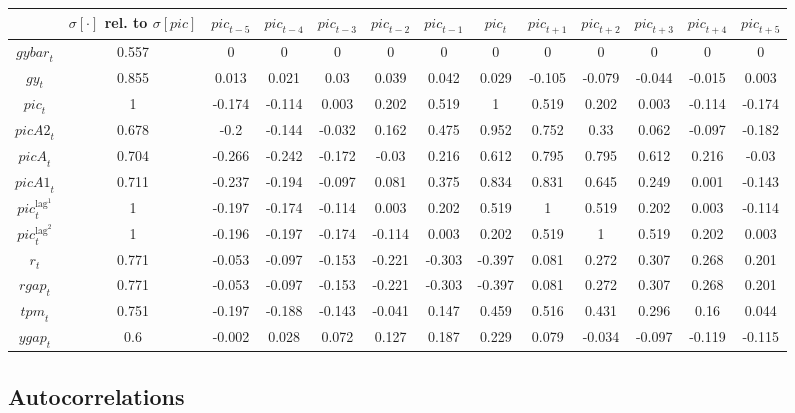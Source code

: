 \begin{tabular}{c|c|c|c|c|c|c|c|c|c|c|c|c|}
  & $\sigma[\cdot]$ rel. to $\sigma[{p\!i\!c}]$ & ${p\!i\!c}_{t-5}$ & ${p\!i\!c}_{t-4}$ & ${p\!i\!c}_{t-3}$ & ${p\!i\!c}_{t-2}$ & ${p\!i\!c}_{t-1}$ & ${p\!i\!c}_{t}$ & ${p\!i\!c}_{t+1}$ & ${p\!i\!c}_{t+2}$ & ${p\!i\!c}_{t+3}$ & ${p\!i\!c}_{t+4}$ & ${p\!i\!c}_{t+5}$\\
\hline
${g\!y\!b\!a\!r}_{t}$ & 0.557 & 0 & 0 & 0 & 0 & 0 & 0 & 0 & 0 & 0 & 0 & 0 \\
${g\!y}_{t}$ & 0.855 & 0.013 & 0.021 & 0.03 & 0.039 & 0.042 & 0.029 & -0.105 & -0.079 & -0.044 & -0.015 & 0.003 \\
${p\!i\!c}_{t}$ & 1 & -0.174 & -0.114 & 0.003 & 0.202 & 0.519 & 1 & 0.519 & 0.202 & 0.003 & -0.114 & -0.174 \\
${p\!i\!c\!A\!2}_{t}$ & 0.678 & -0.2 & -0.144 & -0.032 & 0.162 & 0.475 & 0.952 & 0.752 & 0.33 & 0.062 & -0.097 & -0.182 \\
${p\!i\!c\!A}_{t}$ & 0.704 & -0.266 & -0.242 & -0.172 & -0.03 & 0.216 & 0.612 & 0.795 & 0.795 & 0.612 & 0.216 & -0.03 \\
${p\!i\!c\!A\!1}_{t}$ & 0.711 & -0.237 & -0.194 & -0.097 & 0.081 & 0.375 & 0.834 & 0.831 & 0.645 & 0.249 & 0.001 & -0.143 \\
${p\!i\!c}^{\mathrm{lag}^{\mathrm{1}}}_{t}$ & 1 & -0.197 & -0.174 & -0.114 & 0.003 & 0.202 & 0.519 & 1 & 0.519 & 0.202 & 0.003 & -0.114 \\
${p\!i\!c}^{\mathrm{lag}^{\mathrm{2}}}_{t}$ & 1 & -0.196 & -0.197 & -0.174 & -0.114 & 0.003 & 0.202 & 0.519 & 1 & 0.519 & 0.202 & 0.003 \\
$r_{t}$ & 0.771 & -0.053 & -0.097 & -0.153 & -0.221 & -0.303 & -0.397 & 0.081 & 0.272 & 0.307 & 0.268 & 0.201 \\
${r\!g\!a\!p}_{t}$ & 0.771 & -0.053 & -0.097 & -0.153 & -0.221 & -0.303 & -0.397 & 0.081 & 0.272 & 0.307 & 0.268 & 0.201 \\
${t\!p\!m}_{t}$ & 0.751 & -0.197 & -0.188 & -0.143 & -0.041 & 0.147 & 0.459 & 0.516 & 0.431 & 0.296 & 0.16 & 0.044 \\
${y\!g\!a\!p}_{t}$ & 0.6 & -0.002 & 0.028 & 0.072 & 0.127 & 0.187 & 0.229 & 0.079 & -0.034 & -0.097 & -0.119 & -0.115 \\
\hline
\end{tabular}


\subsection{Autocorrelations}

